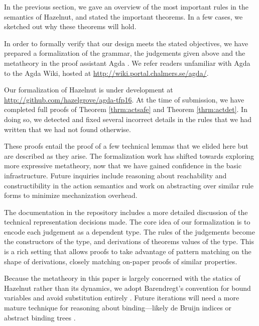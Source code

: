 In the previous section, we gave an overview of the most important rules in
the semantics of Hazelnut, and stated the important theorems. In a few
cases, we sketched out why these theorems will hold.

In order to formally verify that our design meets the stated objectives, we
have prepared a formalization of the grammar, the judgements given above
and the metatheory in the proof assistant Agda \cite{norell:thesis}. We
refer readers unfamiliar with Agda to the Agda Wiki, hosted
at \url{http://wiki.portal.chalmers.se/agda/}.

Our formalization of Hazelnut is under development at
\url{http://github.com/hazelgrove/agda-tfp16}. At the time of submission, we
have completed full proofs of Theorem \ref{thrm:actsafe} and
Theorem \ref{thrm:actdet}. In doing so, we detected and fixed several
incorrect details in the rules that we had written that we had not found
otherwise.

These proofs entail the proof of a few technical lemmas that we elided here
but are described as they arise. The formalization work has shifted towards
exploring more expressive metatheory, now that we have gained confidence in
the basic infrastructure. Future inquiries include reasoning about
reachability and constructibility in the action semantics and work on
abstracting over similar rule forms to minimize mechanization overhead.

The documentation in the repository includes a more detailed discussion of
the technical representation decisions made. The core idea of our
formalization is to encode each judgement as a dependent type. The rules of
the judgements become the constructors of the type, and derivations of
theorems values of the type. This is a rich setting that allows proofs to
take advantage of pattern matching on the shape of derivations, closely
matching on-paper proofs of similar properties.


Because the metatheory in this paper is largely concerned with the statics
of Hazelnut rather than its dynamics, we adopt Barendregt's convention for
bound variables and avoid substitution entirely \cite{urban}. Future
iterations will need a more mature technique for reasoning about
binding---likely de Bruijn indices or abstract binding
trees \cite{lh09unibind,Pouillard11}.
